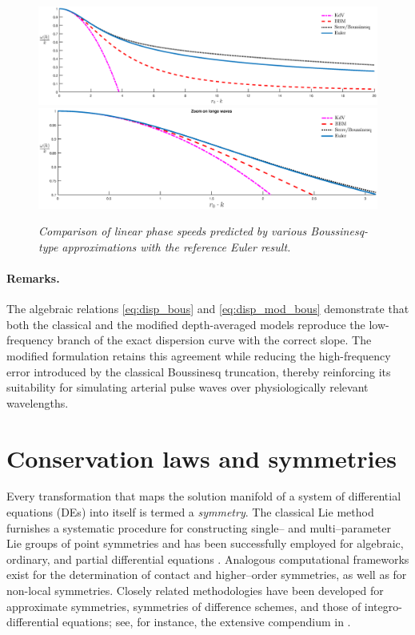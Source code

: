 \documentclass[alpha-refs, 12pt]{wiley-article}
\begin{document}
\begin{figure}[t]
  \centering
  \includegraphics[width=\textwidth]{figs/disp1.eps}
  \includegraphics[width=\textwidth]{figs/disp4.eps}
  \caption{\em Comparison of linear phase speeds predicted by various Boussinesq-type approximations with the reference Euler result.}
  \label{fig:disp}
\end{figure}

\paragraph{Remarks.} The algebraic relations \eqref{eq:disp_bous} and \eqref{eq:disp_mod_bous} demonstrate that both the classical and the modified depth-averaged models reproduce the low-frequency branch of the exact dispersion curve with the correct slope.  The modified formulation retains this agreement while reducing the high-frequency error introduced by the classical Boussinesq truncation, thereby reinforcing its suitability for simulating arterial pulse waves over physiologically relevant wavelengths.

\section{Conservation laws and symmetries}
\label{sec:cons_sym}

Every transformation that maps the solution manifold of a system of differential equations (DEs) into itself is termed a \emph{symmetry}. The classical Lie method furnishes a systematic procedure for constructing single– and multi–parameter Lie groups of point symmetries and has been successfully employed for algebraic, ordinary, and partial differential equations \cite{Cheviakov2007}. Analogous computational frameworks exist for the determination of contact and higher–order symmetries, as well as for non-local symmetries. Closely related methodologies have been developed for approximate symmetries, symmetries of difference schemes, and those of integro-differential equations; see, for instance, the extensive compendium in \cite{Ibragimov1995}.
\end{document}
